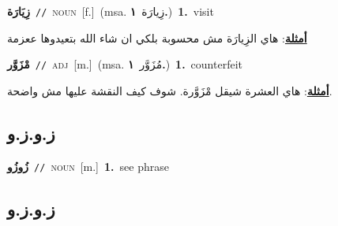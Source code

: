 \documentclass[10pt,a4paper,twoside]{article} %
\begin{document}
\begin{multicols}{2}
{\setlength\topsep{0pt}\textbf{\foreignlanguage{arabic}{زِيَارَة}}\ {\color{gray}\texttt{//}\color{black}}\ \textsc{noun}\ [f.]\ \color{gray}(msa. \foreignlanguage{arabic}{زِيارَة}~\foreignlanguage{arabic}{\textbf{١.}})\color{black}\ \textbf{1.}~visit\  \begin{flushright}\color{gray}\foreignlanguage{arabic}{\textbf{\underline{\foreignlanguage{arabic}{أمثلة}}}: هاي الزِيارَة مش محسوبة بلكي ان شاء الله بتعيدوها ععزمة}\end{flushright}\color{black}} \vspace{2mm}

{\setlength\topsep{0pt}\textbf{\foreignlanguage{arabic}{مْزَوَّر}}\ {\color{gray}\texttt{//}\color{black}}\ \textsc{adj}\ [m.]\ \color{gray}(msa. \foreignlanguage{arabic}{مُزَوَّر}~\foreignlanguage{arabic}{\textbf{١.}})\color{black}\ \textbf{1.}~counterfeit\  \begin{flushright}\color{gray}\foreignlanguage{arabic}{\textbf{\underline{\foreignlanguage{arabic}{أمثلة}}}: هاي العشرة شيقل مْزَوَّرة. شوف كيف النقشة عليها مش واضحة.}\end{flushright}\color{black}} \vspace{2mm}

\vspace{-3mm}
\subsection*{\color{blue}\foreignlanguage{arabic}{ز.و.ز.و}\color{blue}{}} 

{\setlength\topsep{0pt}\textbf{\foreignlanguage{arabic}{زُوزُو}}\ {\color{gray}\texttt{//}\color{black}}\ \textsc{noun}\ [m.]\ \textbf{1.}~see phrase\ } \vspace{2mm}

\vspace{-3mm}
\subsection*{\color{blue}\foreignlanguage{arabic}{ز.و.ز.و}\color{blue}{ (ntws)}} 


\end{multicols}
\end{document}
